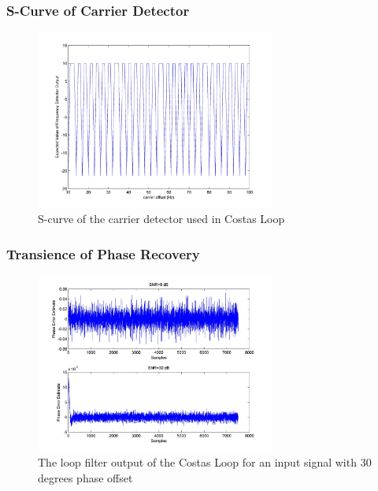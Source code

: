 \documentclass[]{article}
\begin{document}
\subsubsection{S-Curve of Carrier Detector}
\begin{figure}[H]
\centering
\hspace*{-2cm}\includegraphics[width=0.7\textwidth]{qpScurvefo.jpg}
\caption{S-curve of the carrier detector used in Costas Loop \label{fig:costasSfreq}}
\end{figure}
\subsubsection{Transience of Phase Recovery}
\begin{figure}[H]
\centering
\hspace*{-2cm}\includegraphics[width=0.7\textwidth]{qpLoopFilterpo_costas1.jpg}
\caption{The loop filter output of the Costas Loop for an input signal with 30 degrees phase offset  \label{fig:costasTransPhase}}
\end{figure}
\end{document}
